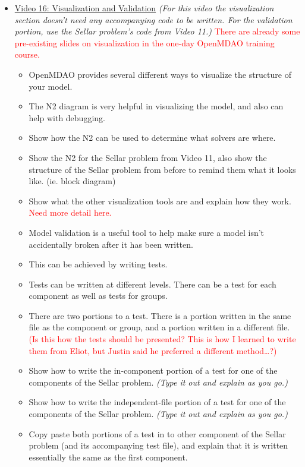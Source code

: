 \documentclass[12pt, letterpaper]{article}
\begin{document}
\begin{itemize}
	\item \underline{Video 16: Visualization and Validation} \textit{(For this video the visualization section doesn’t need any accompanying code to be written. For the validation portion, use the Sellar problem’s code from Video 11.)} \textcolor{red}{There are already some pre-existing slides on visualization in the one-day OpenMDAO training course.}
		\begin{itemize}
			\item OpenMDAO provides several different ways to visualize the structure of your model.
			\item The N2 diagram is very helpful in visualizing the model, and also can help with debugging.
			\item Show how the N2 can be used to determine what solvers are where.
			\item Show the N2 for the Sellar problem from Video 11, also show the structure of the Sellar problem from before to remind them what it looks like. (ie. block diagram)
			\item Show what the other visualization tools are and explain how they work. \textcolor{red}{Need more detail here.}
			\item Model validation is a useful tool to help make sure a model isn’t accidentally broken after it has been written.
			\item This can be achieved by writing tests.
			\item Tests can be written at different levels. There can be a test for each component as well as tests for groups. 
			\item There are two portions to a test. There is a portion written in the same file as the component or group, and a portion written in a different file. \textcolor{red}{(Is this how the tests should be presented? This is how I learned to write them from Eliot, but Justin said he preferred a different method…?)}
			\item Show how to write the in-component portion of a test for one of the components of the Sellar problem. \textit{(Type it out and explain as you go.)}
			\item Show how to write the independent-file portion of a test for one of the components of the Sellar problem. \textit{(Type it out and explain as you go.)}
			\item Copy paste both portions of a test in to other component of the Sellar problem (and its accompanying test file), and explain that it is written essentially the same as the first component.

\end{itemize}
\end{itemize}
\end{document}

